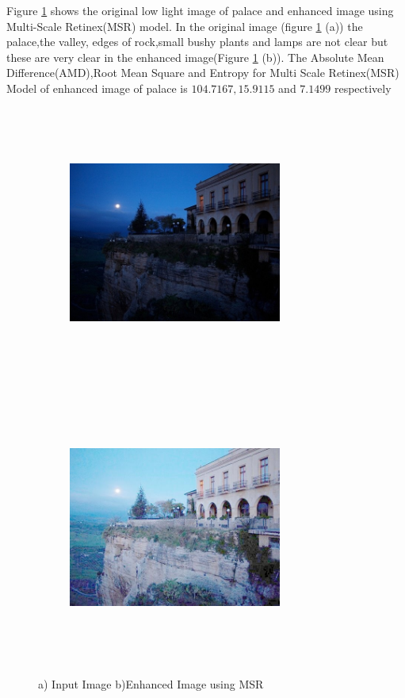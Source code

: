 Figure \ref{fig:msrPalace} shows the original low light image of palace and enhanced image using Multi-Scale Retinex(MSR) model. In the original image (figure \ref{fig:msrPalace} (a))  the palace,the valley, edges of rock,small bushy plants and lamps are not clear but these are very clear in the enhanced image(Figure \ref{fig:msrPalace} (b)). The Absolute Mean Difference(AMD),Root Mean Square and Entropy for Multi Scale Retinex(MSR) Model of enhanced image of palace is $104.7167, 15.9115$ and $7.1499$ respectively      

\begin{figure}
	\begin{subfigure}{8cm}
		\centering    
    	\includegraphics[width=7cm,height=9cm,keepaspectratio]{images/ch5/palace_input.jpg}
    	\caption{} 
    \end{subfigure}
  	\begin{subfigure}{6cm}
  		\centering
  		\includegraphics[width=7cm,height=9cm,keepaspectratio]{images/ch5/palace_msr.jpg}
   		\caption{}
  	\end{subfigure}
  	\caption{a) Input Image b)Enhanced Image using MSR}
  	\label{fig:msrPalace}
\end{figure}

